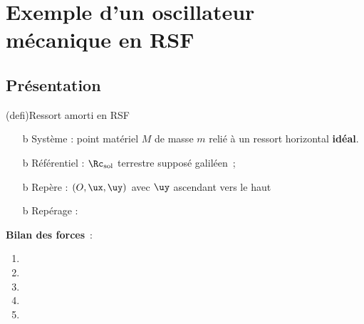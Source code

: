 \documentclass[../../main/main.tex]{subfiles}
\begin{document}
\begin{tcb}
\begin{center}
{		}
	\end{center}
\end{tcb}

\section{Exemple d'un oscillateur mécanique en RSF}
\subsection{Présentation}
\begin{tcb}(defi){Ressort amorti en RSF}
	\begin{itemize}
		\item[b]{Système} : point matériel $M$ de masse $m$ relié à un ressort
		      horizontal \textbf{idéal}.
		\item[b]{Référentiel} : $\Rc_{\rm sol}$ terrestre supposé galiléen~;
		\item[b]{Repère} : $(O,\ux,\uy)$ avec $\uy$ ascendant vers le haut
		\item[b]{Repérage} :
		      \psw{%
			      \[
				      \OM(t) = \ell(t) \ux~;
				      \vf(t) = \lp(t)\ux~;
				      \af(t) = \lpp(t)\ux
			      \]
		      }%
	\end{itemize}
	\vspace{-25pt}
	\begin{isd}[righthand ratio=.45]
		\textbf{Bilan des forces}~:
		\begin{enumerate}
			\item {}%
			\item {}%
			\item {}%
			\item {}%
			\item {}%
		\end{enumerate}
		\tcblower
		\begin{center}
\end{center}
\end{isd}
\end{tcb}
\end{document}
